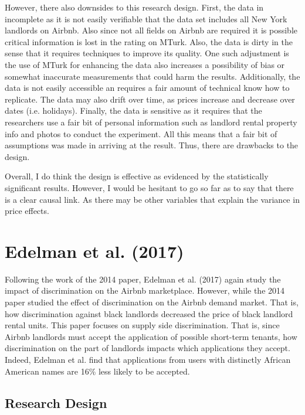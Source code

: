 \documentclass[dvips,12pt]{article}
\begin{document}
However, there also downsides to this research design. First, the data in incomplete as it is not easily verifiable that the data set includes all New York landlords on Airbnb. Also since not all fields on Airbnb are required it is possible critical information is lost in the rating on MTurk. Also, the data is dirty in the sense that it requires techniques to improve its quality. One such adjustment is the use of MTurk for enhancing the data also increases a possibility of bias or somewhat inaccurate measurements that could harm the results. Additionally, the data is not easily accessible an requires a fair amount of technical know how to replicate. The data may also drift over time, as prices increase and decrease over dates (i.e. holidays). Finally, the data is sensitive as it requires that the researchers use a fair bit of personal information such as landlord rental property info and photos to conduct the experiment. All this means that a fair bit of assumptions was made in arriving at the result. Thus, there are drawbacks to the design.

Overall, I do think the design is effective as evidenced by the statistically significant results. However, I would be hesitant to go so far as to say that there is a clear causal link. As there may be other variables that explain the variance in price effects.  

\section{Edelman et al. (2017)}

Following the work of the 2014 paper, Edelman et al. (2017) again study the impact of discrimination on the Airbnb marketplace. However, while the 2014 paper studied the effect of discrimination on the Airbnb demand market. That is, how discrimination against black landlords decreased the price of black landlord rental units. This paper focuses on supply side discrimination. That is, since Airbnb landlords must accept the application of possible short-term tenants, how discrimination on the part of landlords impacts which applications they accept. Indeed, Edelman et al. find that applications from users with distinctly African American names are 16\% less likely to be accepted. 

\subsection{Research Design}
\end{document}
